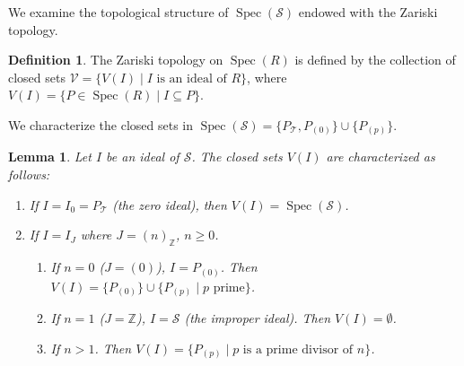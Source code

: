 \documentclass[11pt, a4paper]{article}
\theoremstyle{plain}
\newtheorem{lemma}[theorem]{Lemma}
\theoremstyle{definition}
\newtheorem{definition}[theorem]{Definition}
\numberwithin{equation}{section}
\newcommand{\Z}{\mathbb{Z}}
\newcommand{\Tobj}{\mathcal{T}} %
\newcommand{\SemiringS}{\mathcal{S}}
\DeclareMathOperator{\Spec}{Spec}
\begin{document}
We examine the topological structure of $\Spec(\SemiringS)$ endowed with the Zariski topology.

\begin{definition}
The Zariski topology on $\Spec(R)$ is defined by the collection of closed sets $\mathcal{V} = \{V(I) \mid I \text{ is an ideal of } R\}$, where $V(I) = \{P \in \Spec(R) \mid I \subseteq P\}$.
\end{definition}

We characterize the closed sets in $\Spec(\SemiringS) = \{P_{\Tobj}, P_{(0)}\} \cup \{P_{(p)}\}$.

\begin{lemma}\label{lem:V(I)}
Let $I$ be an ideal of $\SemiringS$. The closed sets $V(I)$ are characterized as follows:
\begin{enumerate}
    \item If $I=I_0=P_{\Tobj}$ (the zero ideal), then $V(I) = \Spec(\SemiringS)$.
    \item If $I=I_J$ where $J=(n)_{\Z}$, $n\ge 0$.
    \begin{enumerate}
        \item If $n=0$ ($J=(0)$), $I=P_{(0)}$. Then $V(I) = \{P_{(0)}\} \cup \{P_{(p)} \mid p \text{ prime}\}$.
        \item If $n=1$ ($J=\Z$), $I=\SemiringS$ (the improper ideal). Then $V(I) = \emptyset$.
        \item If $n>1$. Then $V(I) = \{P_{(p)} \mid p \text{ is a prime divisor of } n\}$.
    \end{enumerate}
\end{enumerate}
\end{lemma}
\end{document}
